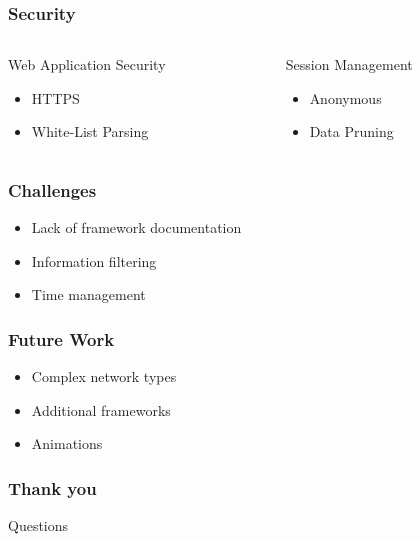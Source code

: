 \documentclass{beamer}
\begin{document}
\begin{frame}
    \frametitle{Security}
    \begin{columns}
        \begin{column}{0.5\textwidth}
            \begin{block}{Web Application Security}
                \begin{itemize}
                    \item HTTPS
                    \item White-List Parsing
                \end{itemize}
            \end{block}
        \end{column}
        \pause
        \begin{column}{0.5\textwidth}
            \begin{block}{Session Management}
                \begin{itemize}
                    \item Anonymous
                    \item Data Pruning
                \end{itemize}
            \end{block}
        \end{column}
    \end{columns}
\end{frame}

\begin{frame}
    \frametitle{Challenges}
    \begin{itemize}
        \item Lack of framework documentation \pause
        \item Information filtering \pause
        \item Time management
    \end{itemize}
\end{frame}

\begin{frame}
    \frametitle{Future Work}
    \begin{itemize}
        \item Complex network types \pause
        \item Additional frameworks \pause
        \item Animations
    \end{itemize}
\end{frame}

\begin{frame}
    \frametitle{Thank you}
    Questions
    \centering
\end{frame}
\end{document}
